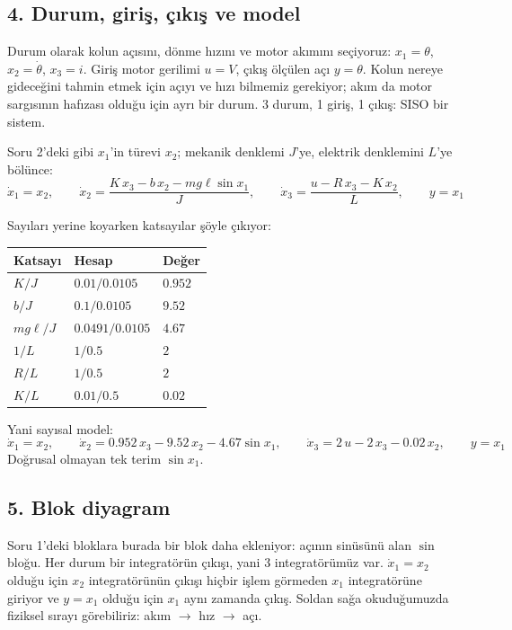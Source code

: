 \documentclass[11pt,a4paper]{article}
\begin{document}
\subsection*{4. Durum, giriş, çıkış ve model}

Durum olarak kolun açısını, dönme hızını ve motor akımını seçiyoruz: $x_1 = \theta$, $x_2 = \dot\theta$, $x_3 = i$. Giriş motor gerilimi $u = V$, çıkış ölçülen açı $y = \theta$. Kolun nereye gideceğini tahmin etmek için açıyı ve hızı bilmemiz gerekiyor; akım da motor sargısının hafızası olduğu için ayrı bir durum. 3 durum, 1 giriş, 1 çıkış: SISO bir sistem.

Soru 2'deki gibi $x_1$'in türevi $x_2$; mekanik denklemi $J$'ye, elektrik denklemini $L$'ye bölünce:
\[
\dot x_1 = x_2, \qquad
\dot x_2 = \frac{K\,x_3 - b\,x_2 - mg\ell\sin x_1}{J}, \qquad
\dot x_3 = \frac{u - R\,x_3 - K\,x_2}{L}, \qquad
y = x_1
\]

Sayıları yerine koyarken katsayılar şöyle çıkıyor:
\begin{center}
\begin{tabular}{lll}
\toprule
Katsayı & Hesap & Değer\\
\midrule
$K/J$ & $0.01 / 0.0105$ & $0.952$\\
$b/J$ & $0.1 / 0.0105$ & $9.52$\\
$mg\ell/J$ & $0.0491 / 0.0105$ & $4.67$\\
$1/L$ & $1 / 0.5$ & $2$\\
$R/L$ & $1 / 0.5$ & $2$\\
$K/L$ & $0.01 / 0.5$ & $0.02$\\
\bottomrule
\end{tabular}
\end{center}
Yani sayısal model:
\[
\dot x_1 = x_2, \qquad
\dot x_2 = 0.952\,x_3 - 9.52\,x_2 - 4.67\sin x_1, \qquad
\dot x_3 = 2\,u - 2\,x_3 - 0.02\,x_2, \qquad
y = x_1
\]
Doğrusal olmayan tek terim $\sin x_1$.

\subsection*{5. Blok diyagram}

Soru 1'deki bloklara burada bir blok daha ekleniyor: açının sinüsünü alan $\sin$ bloğu. Her durum bir integratörün çıkışı, yani 3 integratörümüz var. $\dot x_1 = x_2$ olduğu için $x_2$ integratörünün çıkışı hiçbir işlem görmeden $x_1$ integratörüne giriyor ve $y = x_1$ olduğu için $x_1$ aynı zamanda çıkış. Soldan sağa okuduğumuzda fiziksel sırayı görebiliriz: akım $\to$ hız $\to$ açı.
\end{document}
